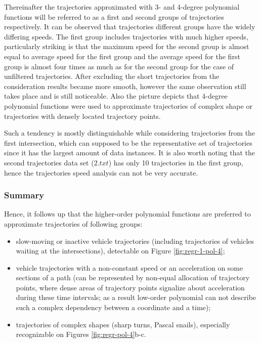 Thereinafter the trajectories approximated with 3- and 4-degree polynomial functions will be referred to as a first and second groups of trajectories respectively. It can be observed that trajectories different groups have the widely differing speeds. The first group includes trajectories with much higher speeds, particularly striking is that the maximum speed for the second group is almost equal to average speed for the first group and the average speed for the first group is almost four times as much as for the second group for the case of unfiltered trajectories. After excluding the short trajectories from the consideration results became more smooth, however the same observation still takes place and is still noticeable. Also the picture depicts that 4-degree polynomial functions were used to approximate trajectories of complex shape or trajectories with densely located trajectory points. 

Such a tendency is mostly distinguishable while considering trajectories from the first intersection, which can supposed to be the representative set of trajectories since it has the largest amount of data instances. It is also worth noting that the second trajectories data set ($2.txt$) has only 10 trajectories in the first group, hence the trajectories speed analysis can not be very accurate.

\subsubsection{Summary}

Hence, it follows up that the higher-order polynomial functions are preferred to approximate trajectories of following groups:

\begin{itemize}
	\setlength\itemsep{0em}
	\item slow-moving or inactive vehicle trajectories (including trajectories of vehicles waiting at the intersections), detectable on Figure \ref{fig:regr-1-pol-4};
	\item vehicle trajectories with a non-constant speed or an acceleration on some sections of a path (can be represented by non-equal allocation of trajectory points, where dense areas of trajectory points signalize about acceleration during these time intervals; as a result low-order polynomial can not describe such a complex dependency between a coordinate and a time);
	\item trajectories of complex shapes (sharp turns, Pascal snails), especially recognizable on Figures \ref{fig:regr-pol-4}b-c.
\end{itemize}

